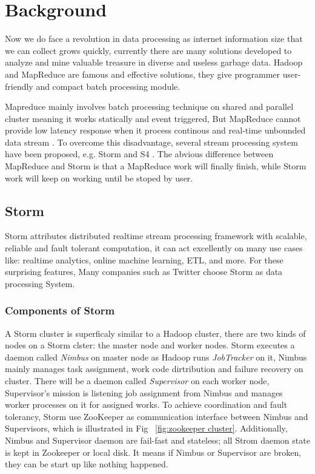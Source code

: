 \chapter{Background}
\label{chap:background}

Now we do face a revolution in data processing as internet information size that we can collect grows quickly, currently there are many solutions developed to analyze and mine valuable treasure in diverse and useless garbage data.
Hadoop \cite{5496972} and MapReduce \cite{Dean:2008:MSD:1327452.1327492} are famous and effective solutions, they give programmer user-friendly and compact batch processing module. 

Mapreduce mainly involves batch processing technique on shared and parallel cluster meaning it works statically and event triggered, But MapReduce cannot provide low latency response when it process continous and real-time unbounded data stream \cite{Babcock:2002:MID:543613.543615}.
To overcome this disadvantage, several stream processing system have been proposed, e.g. Storm \cite{Aniello:2013:AOS:2488222.2488267}
 and S4 \cite{5693297}.
The abvious difference between MapReduce and Storm is that a MapReduce work will finally finish, while Storm work will keep on working until be stoped by user.

\section*{Storm}

Storm attributes distributed realtime stream processing framework with scalable, reliable and fault tolerant computation, it can act excellently on many use cases like: realtime analytics, online machine learning, ETL, and more.
For these surprising features, Many companies such as Twitter choose Storm as data processing System.

\subsection*{Components of Storm}

A Storm cluster is superficaly similar to a Hadoop cluster, there are two kinds of nodes on a Storm clster: the master node and worker nodes.
Storm executes a daemon called {\em Nimbus} on master node as Hadoop runs {\em JobTracker} on it, Nimbus mainly manages task assignment, work code dirtribution and failure recovery on cluster.
There will be a daemon called {\em Supervisor} on each worker node, Supervisor's mission is listening job assignment from Nimbus and manages worker processes on it for assigned works.
To achieve coordination and fault tolerancy, Storm use ZooKeeper \cite{Hunt:2010:ZWC:1855840.1855851} as communication interface between Nimbus and Supervisors, which is illustrated in Fig ~\ref{fig:zookeeper cluster}. 
Additionally, Nimbus and Supervisor daemon are fail-fast and stateless; all Strom daemon state is kept in Zookeeper or local disk.
It means if Nimbus or Supervisor are broken, they can be start up like nothing happened.

